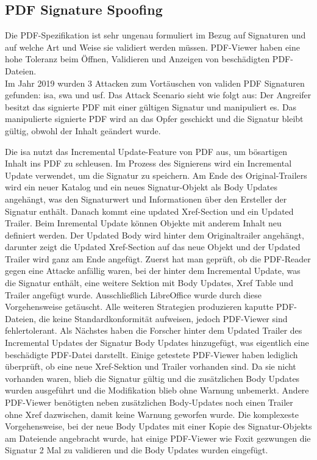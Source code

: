 \subsection{PDF Signature Spoofing}
Die PDF-Spezifikation ist sehr ungenau formuliert im Bezug auf Signaturen und auf welche Art und Weise sie validiert werden müssen. PDF-Viewer haben eine hohe Toleranz beim Öffnen, Validieren und Anzeigen von beschädigten PDF-Dateien. \\
Im Jahr 2019 wurden 3 Attacken zum Vortäuschen von validen PDF Signaturen gefunden: \gls{isa}, \gls{swa} und \gls{usf}. Das Attack Scenario sieht wie folgt aus: Der Angreifer besitzt das signierte PDF mit einer gültigen Signatur und manipuliert es. Das manipulierte  signierte PDF wird an das Opfer geschickt und die Signatur bleibt gültig, obwohl der Inhalt geändert wurde. \cite{ccc-break-pdf}
\par
Die \gls{isa} nutzt das Incremental Update-Feature von PDF aus, um bösartigen Inhalt ins PDF zu schleusen. Im Prozess des Signierens wird ein Incremental Update verwendet, um die Signatur zu speichern. Am Ende des Original-Trailers wird ein neuer Katalog und ein neues Signatur-Objekt als Body Updates angehängt, was den Signaturwert und Informationen über den Ersteller der Signatur enthält. Danach kommt eine updated Xref-Section und ein Updated Trailer. Beim Inremental Update können Objekte mit anderem Inhalt neu definiert werden. Der Updated Body wird hinter dem Originaltrailer angehängt, darunter zeigt die Updated Xref-Section auf das neue Objekt und der Updated Trailer wird ganz am Ende angefügt. Zuerst hat man geprüft, ob die PDF-Reader gegen eine Attacke anfällig waren, bei der hinter dem Incremental Update, was die Signatur enthält, eine weitere Sektion mit Body Updates, Xref Table und Trailer angefügt wurde. Ausschließlich LibreOffice wurde durch diese Vorgehensweise getäuscht. Alle weiteren Strategien produzieren kaputte PDF-Dateien, die keine Standardkonformität aufweisen, jedoch PDF-Viewer sind fehlertolerant. Als Nächstes haben die Forscher hinter dem Updated Trailer des Incremental Updates der Signatur Body Updates hinzugefügt, was eigentlich eine beschädigte PDF-Datei darstellt. Einige getestete PDF-Viewer haben lediglich überprüft, ob eine neue Xref-Sektion und Trailer vorhanden sind. Da sie nicht vorhanden waren, blieb die Signatur gültig und die zusätzlichen Body Updates wurden ausgeführt und die Modifikation blieb ohne Warnung unbemerkt. Andere PDF-Viewer benötigten neben zusätzlichen Body-Updates noch einen Trailer ohne Xref dazwischen, damit keine Warnung geworfen wurde. Die komplexeste Vorgehensweise, bei der neue Body Updates mit einer Kopie des Signatur-Objekts am Dateiende angebracht wurde, hat einige PDF-Viewer wie Foxit gezwungen die Signatur 2 Mal zu validieren und die Body Updates wurden eingefügt. \cite{ccc-break-pdf}

